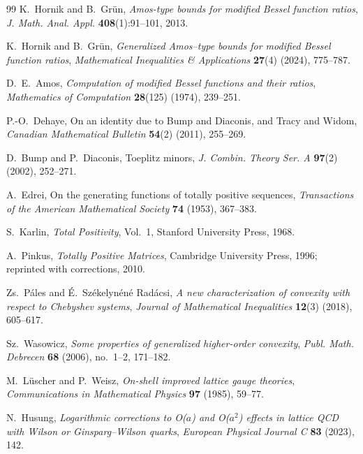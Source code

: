 \begin{thebibliography}{99}
K.~Hornik and B.~Gr\"un,
\newblock \emph{Amos-type bounds for modified Bessel function ratios},
\newblock \emph{J. Math. Anal. Appl.} \textbf{408}(1):91--101, 2013.

K.~Hornik and B.~Gr\"un,
\newblock \emph{Generalized Amos--type bounds for modified Bessel function ratios},
\newblock \emph{Mathematical Inequalities \& Applications} \textbf{27}(4) (2024), 775--787.

D.~E.~Amos,
\newblock \emph{Computation of modified Bessel functions and their ratios},
\newblock \emph{Mathematics of Computation} \textbf{28}(125) (1974), 239--251.

P.-O.~Dehaye,
\newblock On an identity due to Bump and Diaconis, and Tracy and Widom,
\newblock \emph{Canadian Mathematical Bulletin} \textbf{54}(2) (2011), 255--269.

D.~Bump and P.~Diaconis,
\newblock Toeplitz minors,
\newblock \emph{J. Combin. Theory Ser. A} \textbf{97}(2) (2002), 252--271.

A.~Edrei,
\newblock On the generating functions of totally positive sequences,
\newblock \emph{Transactions of the American Mathematical Society} \textbf{74} (1953), 367--383.

S.~Karlin,
\newblock \emph{Total Positivity},
\newblock Vol.~1, Stanford University Press, 1968.

A.~Pinkus,
\newblock \emph{Totally Positive Matrices},
\newblock Cambridge University Press, 1996; reprinted with corrections, 2010.

Zs.~P\'ales and \'E.~Sz\'ekelyn\'en\'e Rad\'acsi,
\newblock \emph{A new characterization of convexity with respect to Chebyshev systems},
\newblock \emph{Journal of Mathematical Inequalities} \textbf{12}(3) (2018), 605--617.

Sz.~Wasowicz,
\newblock \emph{Some properties of generalized higher-order convexity},
\newblock \emph{Publ. Math. Debrecen} \textbf{68} (2006), no.~1--2, 171--182.

M.~L\"uscher and P.~Weisz,
\newblock \emph{On-shell improved lattice gauge theories},
\newblock \emph{Communications in Mathematical Physics} \textbf{97} (1985), 59--77.

N.~Husung,
\newblock \emph{Logarithmic corrections to O($a$) and O($a^2$) effects in lattice QCD with Wilson or Ginsparg--Wilson quarks},
\newblock \emph{European Physical Journal C} \textbf{83} (2023), 142.


\end{thebibliography}
